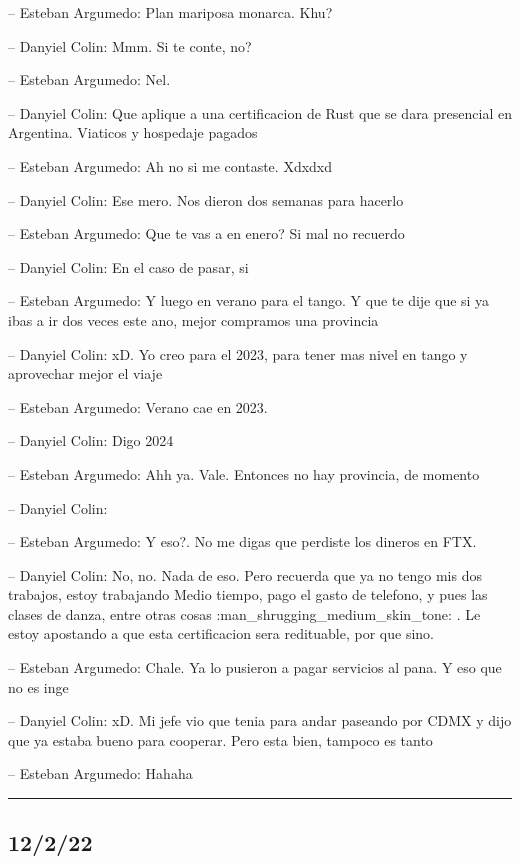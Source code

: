 -- Esteban Argumedo: Plan mariposa monarca. Khu?

-- Danyiel Colin: Mmm. Si te conte, no?

-- Esteban Argumedo: Nel.

-- Danyiel Colin: Que aplique a una certificacion de Rust que se dara
presencial en Argentina. Viaticos y hospedaje pagados

-- Esteban Argumedo: Ah no si me contaste. Xdxdxd

-- Danyiel Colin: Ese mero. Nos dieron dos semanas para hacerlo

-- Esteban Argumedo: Que te vas a en enero? Si mal no recuerdo

-- Danyiel Colin: En el caso de pasar, si

-- Esteban Argumedo: Y luego en verano para el tango. Y que te dije que
si ya ibas a ir dos veces este ano, mejor compramos una provincia

-- Danyiel Colin: xD. Yo creo para el 2023, para tener mas nivel en
tango y aprovechar mejor el viaje

-- Esteban Argumedo: Verano cae en 2023.

-- Danyiel Colin: Digo 2024

-- Esteban Argumedo: Ahh ya. Vale. Entonces no hay provincia, de momento

-- Danyiel Colin:

-- Esteban Argumedo: Y eso?. No me digas que perdiste los dineros en
FTX.

-- Danyiel Colin: No, no. Nada de eso. Pero recuerda que ya no tengo mis
dos trabajos, estoy trabajando Medio tiempo, pago el gasto de telefono,
y pues las clases de danza, entre otras cosas
:man\_shrugging\_medium\_skin\_tone: . Le estoy apostando a que esta
certificacion sera redituable, por que sino.

-- Esteban Argumedo: Chale. Ya lo pusieron a pagar servicios al pana. Y
eso que no es inge

-- Danyiel Colin: xD. Mi jefe vio que tenia para andar paseando por CDMX
y dijo que ya estaba bueno para cooperar. Pero esta bien, tampoco es
tanto

-- Esteban Argumedo: Hahaha

\begin{center}\rule{0.5\linewidth}{0.5pt}\end{center}

\hypertarget{section-168}{%
\subsection{12/2/22}\label{section-168}}

